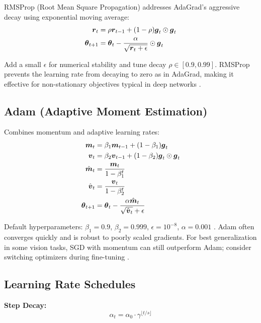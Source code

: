 RMSProp (Root Mean Square Propagation) addresses AdaGrad's aggressive decay using exponential moving average:
\begin{align}
\boldsymbol{r}_t &= \rho \boldsymbol{r}_{t-1} + (1-\rho) \boldsymbol{g}_t \odot \boldsymbol{g}_t \\
\boldsymbol{\theta}_{t+1} &= \boldsymbol{\theta}_t - \frac{\alpha}{\sqrt{\boldsymbol{r}_t + \epsilon}} \odot \boldsymbol{g}_t
\end{align}

Add a small \(\epsilon\) for numerical stability and tune decay \(\rho\in[0.9,0.99]\). RMSProp prevents the learning rate from decaying to zero as in AdaGrad, making it effective for non-stationary objectives typical in deep networks \cite{Tieleman2012,WebOptimizationDLBook,D2LChapterOptimization}.

\subsection{Adam (Adaptive Moment Estimation)}

Combines momentum and adaptive learning rates:
\begin{align}
\boldsymbol{m}_t &= \beta_1 \boldsymbol{m}_{t-1} + (1-\beta_1) \boldsymbol{g}_t \\
\boldsymbol{v}_t &= \beta_2 \boldsymbol{v}_{t-1} + (1-\beta_2) \boldsymbol{g}_t \odot \boldsymbol{g}_t \\
\hat{\boldsymbol{m}}_t &= \frac{\boldsymbol{m}_t}{1 - \beta_1^t} \\
\hat{\boldsymbol{v}}_t &= \frac{\boldsymbol{v}_t}{1 - \beta_2^t} \\
\boldsymbol{\theta}_{t+1} &= \boldsymbol{\theta}_t - \frac{\alpha \hat{\boldsymbol{m}}_t}{\sqrt{\hat{\boldsymbol{v}}_t} + \epsilon}
\end{align}

Default hyperparameters: $\beta_1 = 0.9$, $\beta_2 = 0.999$, $\epsilon = 10^{-8}$, $\alpha = 0.001$ \cite{Kingma2014}. Adam often converges quickly and is robust to poorly scaled gradients. For best generalization in some vision tasks, SGD with momentum can still outperform Adam; consider switching optimizers during fine-tuning \cite{GoodfellowEtAl2016,D2LChapterOptimization,He2016}.

\subsection{Learning Rate Schedules}

\textbf{Step Decay:}
\begin{equation}
\alpha_t = \alpha_0 \cdot \gamma^{\lfloor t / s \rfloor}
\end{equation}

